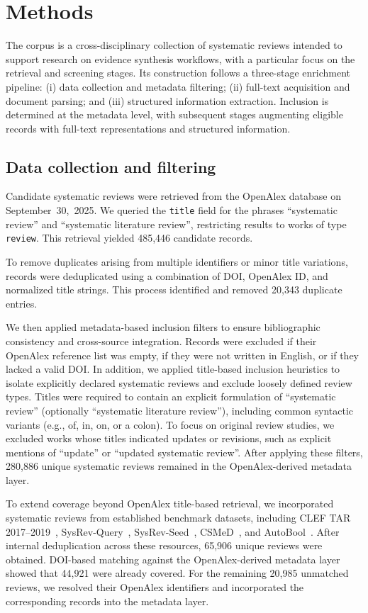\section*{Methods}

The corpus is a cross-disciplinary collection of systematic reviews intended to support research on evidence synthesis workflows, with a particular focus on the retrieval and screening stages. Its construction follows a three-stage enrichment pipeline: (i) data collection and metadata filtering; (ii) full-text acquisition and document parsing; and (iii) structured information extraction. Inclusion is determined at the metadata level, with subsequent stages augmenting eligible records with full-text representations and structured information.

\subsection*{Data collection and filtering}
Candidate systematic reviews were retrieved from the OpenAlex database on September~30,~2025. We queried the \texttt{title} field for the phrases ``systematic review'' and ``systematic literature review'', restricting results to works of type \texttt{review}. This retrieval yielded 485,446 candidate records.

To remove duplicates arising from multiple identifiers or minor title variations, records were deduplicated using a combination of DOI, OpenAlex ID, and normalized title strings. This process identified and removed 20,343 duplicate entries.

We then applied metadata-based inclusion filters to ensure bibliographic consistency and cross-source integration. Records were excluded if their OpenAlex reference list was empty, if they were not written in English, or if they lacked a valid DOI. In addition, we applied title-based inclusion heuristics to isolate explicitly declared systematic reviews and exclude loosely defined review types. Titles were required to contain an explicit formulation of ``systematic review'' (optionally ``systematic literature review''), including common syntactic variants (e.g., of, in, on, or a colon). To focus on original review studies, we excluded works whose titles indicated updates or revisions, such as explicit mentions of ``update'' or ``updated systematic review''. After applying these filters, 280,886 unique systematic reviews remained in the OpenAlex-derived metadata layer.

To extend coverage beyond OpenAlex title-based retrieval, we incorporated systematic reviews from established benchmark datasets, including CLEF TAR 2017--2019~\cite{kanoulas:2017,kanoulas:2018,kanoulas:2019}, SysRev-Query~\cite{scells:2017}, SysRev-Seed~\cite{wang:2022}, CSMeD~\cite{kusa:2023}, and AutoBool~\cite{wang:2025b}. After internal deduplication across these resources, 65,906 unique reviews were obtained. DOI-based matching against the OpenAlex-derived metadata layer showed that 44,921 were already covered. For the remaining 20,985 unmatched reviews, we resolved their OpenAlex identifiers and incorporated the corresponding records into the metadata layer.

